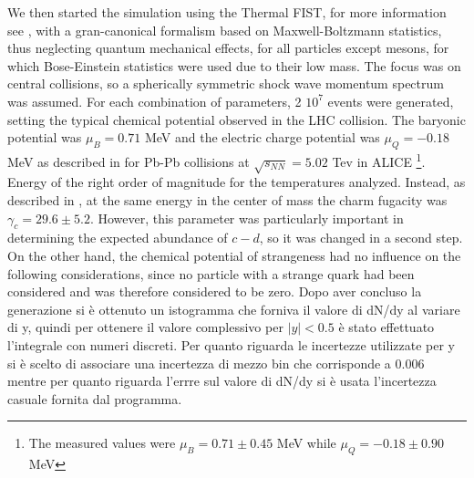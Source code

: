 \documentclass[12pt,a4paper]{book}
\begin{document}
	We then started the simulation using the Thermal FIST, for more information see \cite{Vovchenko_2019}, with a gran-canonical formalism based on Maxwell-Boltzmann statistics, thus neglecting quantum mechanical effects, for all particles except mesons, for which Bose-Einstein statistics were used due to their low mass. The focus was on central collisions, so a spherically symmetric shock wave momentum spectrum was assumed. For each combination of parameters, 2 $10^7$ events were generated, setting the typical chemical potential observed in the LHC collision. The baryonic potential was $\mu_B=0.71$ MeV and the electric charge potential was $\mu_Q= -0.18$ MeV as described in \cite{Acharya_2024} for Pb-Pb collisions at $\sqrt{s_{NN}}= 5.02$ Tev in ALICE \footnote{The measured values were $\mu_B=0.71 \pm 0.45$ MeV while $\mu_Q=-0.18 \pm 0.90$ MeV}. Energy of the right order of magnitude for the temperatures analyzed. Instead, as described in \cite{charm_hierarchy_in_the_statistical_hadronization_model}, at the same energy in the center of mass the charm fugacity was $\gamma_c = 29.6 \pm 5.2$. However, this parameter was particularly important in determining the expected abundance of $c-d$, so it was changed in a second step. On the other hand, the chemical potential of strangeness had no influence on the following considerations, since no particle with a strange quark had been considered and was therefore considered to be zero. Dopo aver concluso la generazione si è ottenuto un istogramma che forniva il valore di dN/dy al variare di y, quindi per ottenere il valore complessivo per $|y|<0.5$ è stato effettuato l'integrale con numeri discreti. Per quanto riguarda le incertezze utilizzate per y si è scelto di associare una incertezza di mezzo bin che corrisponde a 0.006 mentre per quanto riguarda l'errre sul valore di dN/dy si è usata l'incertezza casuale fornita dal programma.
\end{document}
